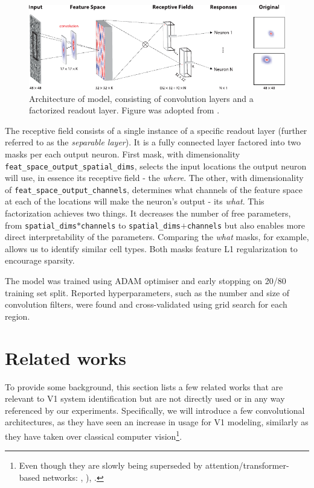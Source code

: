 \begin{figure}[h]
    \centering
    \includegraphics[width=1\textwidth]{../figures/02_fig2}
    \caption[klindt et al. model]{Architecture of \citeauthor{klindt} model, consisting of convolution layers and a factorized readout layer. Figure was adopted from \citep{klindt}.}
    \label{fig:2.2}
\end{figure}

The receptive field consists of a single instance of a specific readout layer (further referred to as the \textit{separable layer}). It is a fully connected layer factored into two masks per each output neuron. First mask, with dimensionality \texttt{feat\_space\_output\_spatial\_dims}, selects the input locations the output neuron will use, in essence its receptive field - the \textit{where}. The other, with dimensionality of \texttt{feat\_space\_output\_channels}, determines what channels of the feature space at each of the locations will make the neuron’s output - its \textit{what}. This factorization achieves two things. It decreases the number of free parameters, from \texttt{spatial\_dims}$*$\texttt{channels} to \texttt{spa\-tial\_dims}$+$\texttt{channels} but also enables more direct interpretability of the parameters. Comparing the \textit{what} masks, for example, allows us to identify similar cell types. Both masks feature L1 regularization to encourage sparsity.

The model was trained using ADAM optimiser and early stopping on 20/80 training set split. Reported hyperparameters, such as the number and size of convolution filters, were found and cross-validated using grid search for each region.

\section{Related works}\label{ch:2.3}
To provide some background, this section lists a few related works that are relevant to V1 system identification but are not directly used or in any way referenced by our experiments. Specifically, we will introduce a few convolutional architectures, as they have seen an increase in usage for V1 modeling, similarly as they have taken over classical computer vision\footnote{Even though they are slowly being superseded by attention/transformer-based networks: \citep{2019arXiv190605909R}, \citep{2019arXiv190409925B}), \citep{dosovitskiy2020image}.}.


